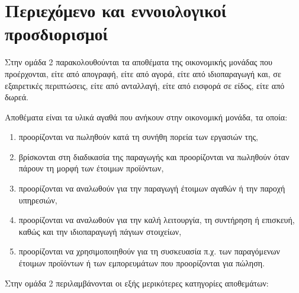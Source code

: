 \documentclass[A4,10pt,greek]{book}
\begin{document}
\section{Περιεχόμενο και εννοιολογικοί προσδιορισμοί}

Στην ομάδα 2 παρακολουθούνται τα αποθέματα της οικονομικής μονάδας που προέρχονται, είτε από απογραφή, είτε από αγορά, είτε από ιδιοπαραγωγή και, σε εξαιρετικές περιπτώσεις, είτε από ανταλλαγή, είτε από εισφορά σε είδος, είτε από δωρεά.

Αποθέματα είναι τα υλικά αγαθά που ανήκουν στην οικονομική μονάδα, τα οποία: 
\begin{enumerate}
\item προορίζονται να πωληθούν κατά τη συνήθη πορεία των εργασιών της, 
\item βρίσκονται στη διαδικασία της παραγωγής και προορίζονται να πωληθούν όταν πάρουν τη μορφή των έτοιμων προϊόντων, 
\item προορίζονται να αναλωθούν για την παραγωγή έτοιμων αγαθών ή την παροχή υπηρεσιών, 
\item προορίζονται να αναλωθούν για την καλή λειτουργία, τη συντήρηση ή επισκευή, καθώς και την ιδιοπαραγωγή πάγιων στοιχείων, 
\item προορίζονται να χρησιμοποιηθούν για τη συσκευασία π.χ. των παραγόμενων έτοιμων προϊόντων ή των εμπορευμάτων που προορίζονται για πώληση.

\end{enumerate}

Στην ομάδα 2 περιλαμβάνονται οι εξής μερικότερες κατηγορίες αποθεμάτων:
\end{document}
